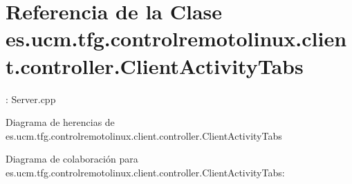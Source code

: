 \hypertarget{classes_1_1ucm_1_1tfg_1_1controlremotolinux_1_1client_1_1controller_1_1ClientActivityTabs}{\section{Referencia de la Clase es.\-ucm.\-tfg.\-controlremotolinux.\-client.\-controller.\-Client\-Activity\-Tabs}
\label{classes_1_1ucm_1_1tfg_1_1controlremotolinux_1_1client_1_1controller_1_1ClientActivityTabs}
}


\-: Server.\-cpp  




Diagrama de herencias de es.\-ucm.\-tfg.\-controlremotolinux.\-client.\-controller.\-Client\-Activity\-Tabs


Diagrama de colaboración para es.\-ucm.\-tfg.\-controlremotolinux.\-client.\-controller.\-Client\-Activity\-Tabs\-:
